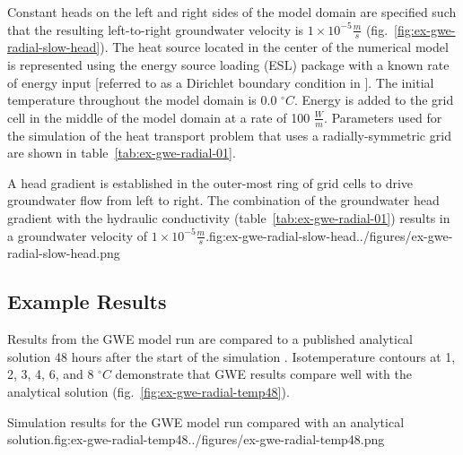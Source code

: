 Constant heads on the left and right sides of the model domain are specified such that the resulting left-to-right groundwater velocity is $1 \times 10^{-5} \tfrac{m}{s}$ (fig.~\ref{fig:ex-gwe-radial-slow-head}).  The heat source located in the center of the numerical model is represented using the energy source loading (ESL) package with a known rate of energy input [referred to as a Dirichlet boundary condition in \cite{alKhoury2020}].  The initial temperature throughout the model domain is 0.0 $^{\circ}C$. Energy is added to the grid cell in the middle of the model domain at a rate of 100 $\tfrac{W}{m}$.  Parameters used for the \mf simulation of the heat transport problem that uses a radially-symmetric grid are shown in table~\ref{tab:ex-gwe-radial-01}.



\begin{StandardFigure}{
    A head gradient is established in the outer-most ring of grid cells to drive groundwater flow from left to right. The combination of the groundwater head gradient with the hydraulic conductivity (table~\ref{tab:ex-gwe-radial-01}) results in a groundwater velocity of $1 \times 10^{-5} \tfrac{m}{s}$.}{fig:ex-gwe-radial-slow-head}{../figures/ex-gwe-radial-slow-head.png}
\end{StandardFigure}

\subsection{Example Results}

Results from the GWE model run are compared to a published analytical solution 48 hours after the start of the simulation \citep{alKhoury2020}.  Isotemperature contours at 1, 2, 3, 4, 6, and 8 $^{\circ}C$ demonstrate that GWE results compare well with the analytical solution (fig.~\ref{fig:ex-gwe-radial-temp48}).

\begin{StandardFigure}{
    Simulation results for the GWE model run compared with an analytical solution.}{fig:ex-gwe-radial-temp48}{../figures/ex-gwe-radial-temp48.png}
\end{StandardFigure}
